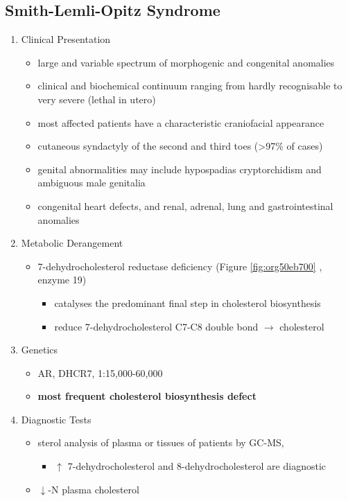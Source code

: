 \documentclass{scrartcl}
\begin{document}
\subsection{Smith-Lemli-Opitz Syndrome}
\label{sec:orgdf79704}
\begin{enumerate}
\item Clinical Presentation
\label{sec:org10dab8c}
\begin{itemize}
\item large and variable spectrum of morphogenic and congenital anomalies
\item clinical and biochemical continuum ranging from hardly recognisable
to very severe (lethal in utero)
\item most affected patients have a characteristic craniofacial appearance
\item cutaneous syndactyly of the second and third toes (>97\% of cases)
\item genital abnormalities may include hypospadias cryptorchidism and
ambiguous male genitalia
\item congenital heart defects, and renal, adrenal, lung and
gastrointestinal anomalies
\end{itemize}

\item Metabolic Derangement
\label{sec:orgc9fe059}
\begin{itemize}
\item 7-dehydrocholesterol reductase deficiency (Figure \ref{fig:org50eb700} , enzyme 19)
\begin{itemize}
\item catalyses the predominant final step in cholesterol biosynthesis
\item reduce 7-dehydrocholesterol C7-C8 double bond \(\to\) cholesterol
\end{itemize}
\end{itemize}

\item Genetics
\label{sec:orgb8016f8}
\begin{itemize}
\item AR, DHCR7, 1:15,000-60,000
\item \textbf{most frequent cholesterol biosynthesis defect}
\end{itemize}

\item Diagnostic Tests
\label{sec:orge2550d5}
\begin{itemize}
\item sterol analysis of plasma or tissues of patients by GC-MS,
\begin{itemize}
\item \(\uparrow\) 7-dehydrocholesterol and 8-dehydrocholesterol are diagnostic
\end{itemize}
\item \(\downarrow\)-N plasma cholesterol
\end{itemize}


\end{enumerate}
\end{document}
